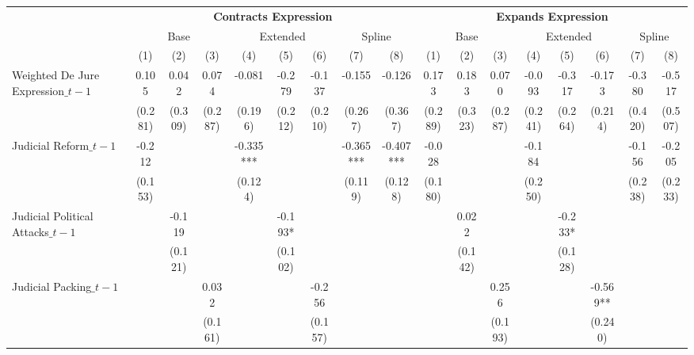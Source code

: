 \begin{tabular}{lcccccccccccccccc}
\toprule

& \multicolumn{8}{c}{\textbf{Contracts Expression}} 
& \multicolumn{8}{c}{\textbf{Expands Expression}} \\

\cmidrule(lr){2-9}
\cmidrule(lr){10-17}

& \multicolumn{3}{c}{Base}
& \multicolumn{3}{c}{Extended}
& \multicolumn{2}{c}{Spline} 
& \multicolumn{3}{c}{Base}
& \multicolumn{3}{c}{Extended}
& \multicolumn{2}{c}{Spline} \\

\cmidrule(lr){2-4}
\cmidrule(lr){5-7}
\cmidrule(lr){8-9}
\cmidrule(lr){10-12}
\cmidrule(lr){13-15}
\cmidrule(lr){16-17}

& (1) & (2) & (3) & (4) & (5) & (6) & (7) & (8)
& (1) & (2) & (3) & (4) & (5) & (6) & (7) & (8) \\

\midrule


Weighted De Jure Expression$\_{t-1}$ 
& 0.105 & 0.042 & 0.074 & -0.081 & -0.279 & -0.137 & -0.155 & -0.126
& 0.173 & 0.183 & 0.070 & -0.093 & -0.317 & -0.173 & -0.380 & -0.517 \\
\vspace{0.5cm}

& (0.281) & (0.309) & (0.287) & (0.196) & (0.212) & (0.210) & (0.267) & (0.367)
& (0.289) & (0.323) & (0.287) & (0.241) & (0.264) & (0.214) & (0.420) & (0.507) \\



Judicial Reform$\_{t-1}$
& -0.212 &  &  & -0.335*** &  &  & -0.365*** & -0.407***
& -0.028 &  &  & -0.184 &  &  & -0.156 & -0.205 \\
\vspace{0.1cm}
& (0.153) &  &  & (0.124) &  &  & (0.119) & (0.128)
& (0.180) &  &  & (0.250) &  &  & (0.238) & (0.233) \\

Judicial Political Attacks$\_{t-1}$
&  & -0.119 &  &  & -0.193* &  &  &
&  & 0.022 &  &  & -0.233* &  &  &  \\
\vspace{0.1cm}
&  & (0.121) &  &  & (0.102) &  &  &
&  & (0.142) &  &  & (0.128) &  &  &  \\

Judicial Packing$\_{t-1}$
&  &  & 0.032 &  &  & -0.256 &  & 
&  &  & 0.256 &  &  & -0.569** &  &  \\
\vspace{0.5cm}
&  &  & (0.161) &  &  & (0.157) &  &
&  &  & (0.193) &  &  & (0.240) &  &  \\


\end{tabular}
